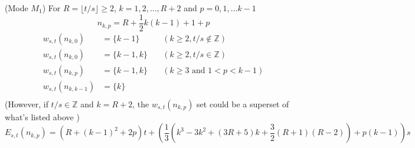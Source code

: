 \documentclass[]{article}
\begin{document}
\hspace{1cm}
\begin{lemma} 
	(Mode $M_1$)  For $R = \lfloor t/s\rfloor \geq 2$, $k = 1,2,\dots,R + 2$ and  $p = 0, 1, \dots k - 1$
	\[
		n_{k,p} = R + \frac{1}{2}k(k-1) + 1 + p
	\]
	\begin{align*}
	    w_{s,t}(n_{k, 0}) &= \{k-1\} &\quad(k\geq 2, t/s\notin\mathbb{Z})\\
	    w_{s,t}(n_{k, 0}) &= \{k-1, k\} &\quad(k\geq 2, t/s\in\mathbb{Z})\\
	    w_{s,t}(n_{k, p}) &= \{k-1, k\}&\quad (k\geq 3 \text{ and } 1 <p<k-1)\\
	    w_{s,t}(n_{k, k-1}) &= \{k\}\\
	\end{align*}
	(However, if $t/s\in\mathbb{Z}$ and $k=R+2$, the $w_{s,t}(n_{k, p})$ set could be a superset of what's listed above )
	\[
	E_{s,t}(n_{k, p}) = \left(R+(k-1)^2+2p\right)t + \left( \frac{1}{3}(k^3-3k^2+(3R+5)k+\frac{3}{2}(R+1)(R-2)) + p(k-1) \right) s
	\]
\end{lemma}
\end{document}
